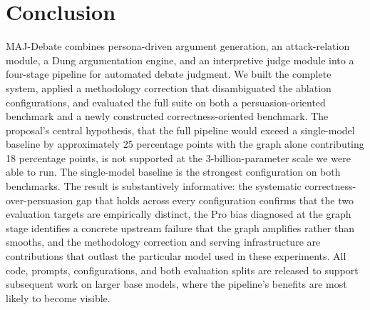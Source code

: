 \documentclass[11pt,twocolumn,letterpaper]{article}
\newcommand{\GraphGain}{18}
\newcommand{\TotalGain}{25}
\begin{document}
\section{Conclusion}

MAJ-Debate combines persona-driven argument generation, an
attack-relation module, a Dung argumentation engine, and an
interpretive judge module into a four-stage pipeline for automated
debate judgment. We built the complete system, applied a
methodology correction that disambiguated the ablation
configurations, and evaluated the full suite on both a
persuasion-oriented benchmark and a newly constructed
correctness-oriented benchmark. The proposal's central hypothesis,
that the full pipeline would exceed a single-model baseline by
approximately \TotalGain{} percentage points with the graph alone
contributing \GraphGain{} percentage points, is not supported at
the 3-billion-parameter scale we were able to run. The single-model
baseline is the strongest configuration on both benchmarks. The
result is substantively informative: the systematic
correctness-over-persuasion gap that holds across every
configuration confirms that the two evaluation targets are
empirically distinct, the Pro bias diagnosed at the graph stage
identifies a concrete upstream failure that the graph amplifies
rather than smooths, and the methodology correction and serving
infrastructure are contributions that outlast the particular
model used in these experiments. All code, prompts, configurations,
and both evaluation splits are released to support subsequent work
on larger base models, where the pipeline's benefits are most
likely to become visible.



\end{document}

